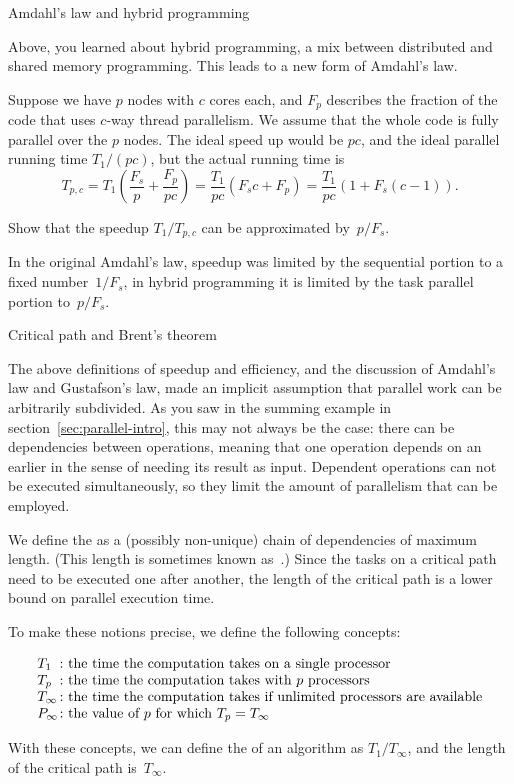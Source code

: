 
 {Amdahl's law and hybrid programming}

Above, you learned about hybrid programming, a mix between distributed
and shared memory programming. This leads to a new form of Amdahl's
law.

Suppose we have $p$ nodes with $c$ cores each, and $F_p$ describes the fraction
of the code that uses $c$-way thread parallelism. We assume that the
whole code is fully parallel over the $p$ nodes.
The ideal speed up would be $p c$, and the ideal parallel running
time $T_1/(pc)$, but the actual running time is 
\[
  T_{p,c} = T_1 \left(\frac {F_s}{p} + \frac{F_p}{p c}\right)
  = \frac{T_1}{pc}\left( F_sc+F_p\right) 
  = \frac{T_1}{pc}\left( 1+ F_s(c-1)\right).
\]
\begin{exercise}
  Show that the speedup $T_1/T_{p,c}$ can be approximated by~$p/F_s$.
\end{exercise}
In the original Amdahl's law, speedup was limited by the sequential
portion to a fixed number~$1/F_s$, in hybrid programming it is limited
by the task parallel portion to~$p/F_s$.


 {Critical path and Brent's theorem}
\label{sec:critical-path}

The above definitions of speedup and efficiency,
and the discussion of Amdahl's law and Gustafson's law,
made an implicit assumption
that parallel work can be arbitrarily subdivided.
As you saw in the summing example in section~\ref{sec:parallel-intro},
this may not always be the case: there can be dependencies between
operations,
meaning that one operation depends on an earlier
in the sense of needing its result as input.
Dependent operations can not be executed simultaneously,
so they limit the amount of parallelism that can be employed.

We define the  as a (possibly non-unique)
chain of dependencies
of maximum length.
(This length is sometimes known as~.)
Since the tasks on a critical path need to be
executed one after another, the length of the critical path is a lower
bound on parallel execution time.

To make these notions precise, we define the following concepts:
\begin{definition}
  \[ 
  \begin{array}{l@{\colon}l}
    T_1&\hbox{the time the computation takes on a single processor}\\
    T_p&\hbox{the time the computation takes with $p$ processors}\\
    T_\infty&\hbox{the time the computation takes if unlimited processors are available}\\
    P_\infty&\hbox{the value of $p$ for which $T_p=T_\infty$}
  \end{array}  
  \]
\end{definition}
With these concepts, we can define the 
of an algorithm as $T_1/T_\infty$, and the length of the critical path is~$T_\infty$.

